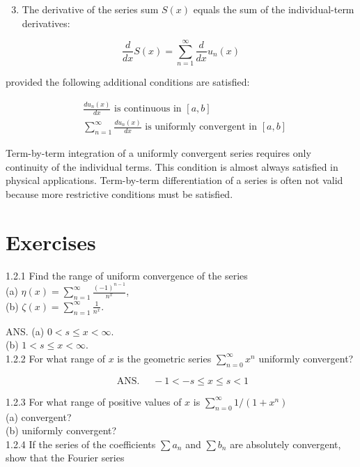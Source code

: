 \documentclass[10pt]{article}
\begin{document}
\begin{enumerate}
  \setcounter{enumi}{2}
  \item The derivative of the series sum $S(x)$ equals the sum of the individual-term derivatives:
\end{enumerate}


\begin{equation*}
\frac{d}{d x} S(x)=\sum_{n=1}^{\infty} \frac{d}{d x} u_{n}(x) \tag{1.39}
\end{equation*}


provided the following additional conditions are satisfied:

$$
\begin{aligned}
& \frac{d u_{n}(x)}{d x} \text { is continuous in }[a, b] \\
& \sum_{n=1}^{\infty} \frac{d u_{n}(x)}{d x} \text { is uniformly convergent in }[a, b]
\end{aligned}
$$

Term-by-term integration of a uniformly convergent series requires only continuity of the individual terms. This condition is almost always satisfied in physical applications. Term-by-term differentiation of a series is often not valid because more restrictive conditions must be satisfied.

\section*{Exercises}
1.2.1 Find the range of uniform convergence of the series\\
(a) $\eta(x)=\sum_{n=1}^{\infty} \frac{(-1)^{n-1}}{n^{x}}$,\\
(b) $\zeta(x)=\sum_{n=1}^{\infty} \frac{1}{n^{x}}$.

ANS. (a) $0<s \leq x<\infty$.\\
(b) $1<s \leq x<\infty$.\\
1.2.2 For what range of $x$ is the geometric series $\sum_{n=0}^{\infty} x^{n}$ uniformly convergent?

$$
\text { ANS. } \quad-1<-s \leq x \leq s<1
$$

1.2.3 For what range of positive values of $x$ is $\sum_{n=0}^{\infty} 1 /\left(1+x^{n}\right)$\\
(a) convergent?\\
(b) uniformly convergent?\\
1.2.4 If the series of the coefficients $\sum a_{n}$ and $\sum b_{n}$ are absolutely convergent, show that the Fourier series
\end{document}
